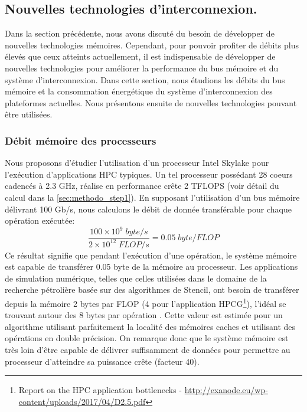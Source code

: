         



\subsection{Nouvelles technologies d'interconnexion.}

    Dans la section précédente, nous avons discuté du besoin de développer de nouvelles technologies mémoires. Cependant, pour pouvoir profiter de débits plus élevés que ceux atteints actuellement, il est indispensable de développer de nouvelles technologies pour améliorer la performance du bus mémoire et du système d'interconnexion. Dans cette section, nous étudions les débits du bus mémoire et la consommation énergétique du système d'interconnexion des plateformes actuelles. Nous présentons ensuite de nouvelles technologies pouvant être utilisées. 

    \subsubsection{Débit mémoire des processeurs} 
        
        Nous proposons d'étudier l'utilisation d'un processeur Intel Skylake pour l'exécution d'applications HPC typiques. Un tel processeur possédant 28 coeurs cadencés à 2.3 GHz, réalise en performance crête 2 TFLOPS (voir détail du calcul dans la \autoref{sec:methodo_step1}). En supposant l'utilisation d'un bus mémoire délivrant 100 Gb/s, nous calculons le débit de donnée transférable pour chaque opération exécutée:
        \begin{equation}
            \frac{100 \times 10^9 \; byte/s}{2 \times 10^{12} \; FLOP/s} = 0.05 \; byte/FLOP
        \end{equation}
        Ce résultat signifie que pendant l'exécution d'une opération, le système mémoire est capable de transférer 0.05 byte de la mémoire au processeur. Les applications de simulation numérique, telles que celles utilisées dans le domaine de la recherche pétrolière basée sur des algorithmes de Stencil, ont besoin de transférer depuis la mémoire 2 bytes par FLOP (4 pour l'application HPCG\footnote{Report on the HPC application bottlenecks - \url{http://exanode.eu/wp-content/uploads/2017/04/D2.5.pdf}}), l'idéal se trouvant autour des 8 bytes par opération \cite{Bergman2015}. Cette valeur est estimée pour un algorithme utilisant parfaitement la localité des mémoires caches et utilisant des opérations en double précision. On remarque donc que le système mémoire est très loin d'être capable de délivrer suffisamment de données pour permettre au processeur d'atteindre sa puissance crête (facteur 40). 
        
